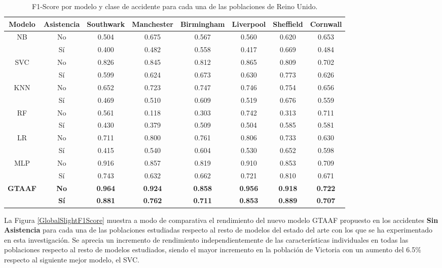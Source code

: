 \documentclass{uathesis-es}
\begin{document}
{\begin{table}[H]
\begin{center}
\begin{tabular}{|c|c||c|c|c|c|c|c|}
        \textbf{Modelo} & \textbf{Asistencia} & Southwark & Manchester & Birmingham & Liverpool & Sheffield & Cornwall
        \\ \hline \hline

        \multirow{2}{*}{NB} &
            No & 0.504 & 0.675 &  0.567 & 0.560 & 0.620 & 0.653 \\ &
            Sí & 0.400 & 0.482 & 0.558 & 0.417 & 0.669 & 0.484 \\ \hline \hline
        \multirow{2}{*}{SVC} &
            No & 0.826 & 0.845 & 0.812 & 0.865 & 0.809 & 0.702 \\ &
            Sí & 0.599 & 0.624 & 0.673 & 0.630 & 0.773 & 0.626 \\ \hline \hline
        \multirow{2}{*}{KNN} &
            No  & 0.652 & 0.723 & 0.747 & 0.746 & 0.754 & 0.656 \\ &
            Sí & 0.469 & 0.510 & 0.609 & 0.519 & 0.676 & 0.559 \\ \hline \hline
        \multirow{2}{*}{RF} &
            No & 0.561  & 0.118 & 0.303 & 0.742 & 0.313 & 0.711 \\ &
            Sí & 0.430 & 0.379 & 0.509 & 0.504 & 0.585 & 0.581 \\ \hline \hline
        \multirow{2}{*}{LR} &
            No & 0.711 & 0.800 & 0.761 & 0.806 & 0.733 & 0.630 \\ &
            Sí & 0.415 & 0.540 & 0.604 & 0.530 & 0.652 & 0.598 \\ \hline \hline
        \multirow{2}{*}{MLP} &
            No & 0.916 &  0.857 & 0.819 & 0.910 & 0.853 & 0.709 \\ &
            Sí & 0.743 & 0.632 & 0.662 & 0.721 & 0.810 & 0.671 \\ \hline \hline
        \multirow{2}{*}{\textbf     {GTAAF}} &
            \textbf{No} & \textbf{0.964} & \textbf{0.924} & \textbf{0.858} & \textbf{0.956} & \textbf{0.918} & \textbf{0.722} \\ &
            \textbf{Sí} & \textbf{0.881} & \textbf{0.762} & \textbf{0.711} & \textbf{0.853} & \textbf{0.889} & \textbf{0.707} \\ \hline \hline
        \end{tabular}
    \end{center}
    \caption{F1-Score por modelo y clase de accidente para cada una de las poblaciones de Reino Unido.}
    \label{UKMetrics}
\end{table}


La Figura \ref{GlobalSlightF1Score} muestra a modo de comparativa el rendimiento del nuevo modelo GTAAF propuesto en los accidentes \textbf{Sin Asistencia} para cada una de las poblaciones estudiadas respecto al resto de modelos del estado del arte con los que se ha experimentado en esta investigación. Se aprecia un incremento de rendimiento independientemente de las características individuales en todas las poblaciones respecto al resto de modelos estudiados, siendo el mayor incremento en la población de Victoria con un aumento del 6.5\% respecto al siguiente mejor modelo, el SVC.

}
\end{document}
